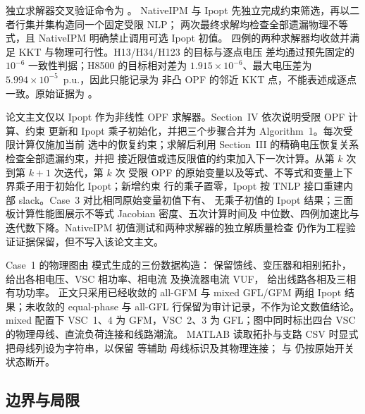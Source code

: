 独立求解器交叉验证命令为
。
NativeIPM 与 Ipopt 先独立完成约束筛选，再以二者行集并集构造同一个固定受限 NLP；
两次最终求解均检查全部遗漏物理不等式，且 NativeIPM 明确禁止调用可选 Ipopt 初值。
四例的两种求解器均收敛并满足 KKT 与物理可行性。H13/H34/H123 的目标与逐点电压
差均通过预先固定的 $10^{-6}$ 一致性判据；H8500 的目标相对差为
$1.915\times10^{-6}$、最大电压差为 $5.994\times10^{-5}$~p.u.，因此只能记录为
非凸 OPF 的邻近 KKT 点，不能表述成逐点一致。原始证据为
。

论文主文仅以 Ipopt 作为非线性 OPF 求解器。Section~IV 依次说明受限 OPF 计算、约束
更新和 Ipopt 乘子初始化，并把三个步骤合并为 Algorithm~1。每次受限计算仅施加当前
选中的恢复约束；求解后利用 Section~III 的精确电压恢复关系检查全部遗漏约束，并把
接近限值或违反限值的约束加入下一次计算。从第 $k$ 次到第 $k+1$ 次迭代，第 $k$ 次
受限 OPF 的原始变量以及等式、不等式和变量上下界乘子用于初始化 Ipopt；新增约束
行的乘子置零，Ipopt 按 TNLP 接口重建内部 slack。Case~3 对比相同原始变量初值下有、
无乘子初值的 Ipopt 结果；三面板计算性能图展示不等式 Jacobian 密度、五次计算时间及
中位数、四例加速比与迭代数下降。NativeIPM 初值测试和两种求解器的独立解质量检查
仍作为工程验证证据保留，但不写入该论文主文。

Case~1 的物理图由  模式生成的三份数据构造：
 保留馈线、变压器和相别拓扑，
 给出各相电压、VSC 相功率、相电流
及换流器电流 VUF，
 给出线路各相及三相有功功率。
正文只采用已经收敛的 all-GFM 与 mixed GFL/GFM 两组 Ipopt 结果；未收敛的
equal-phase 与 all-GFL 行保留为审计记录，不作为论文数值结论。mixed 配置下 VSC~1、4
为 GFM，VSC~2、3 为 GFL；图中同时标出四台 VSC 的物理母线、直流负荷连接和线路潮流。
MATLAB 读取拓扑与支路 CSV 时显式把母线列设为字符串，以保留  等辅助
母线标识及其物理连接； 与  仍按原始开关状态断开。

\subsection{边界与局限}\label{subsec:tp-limit}

